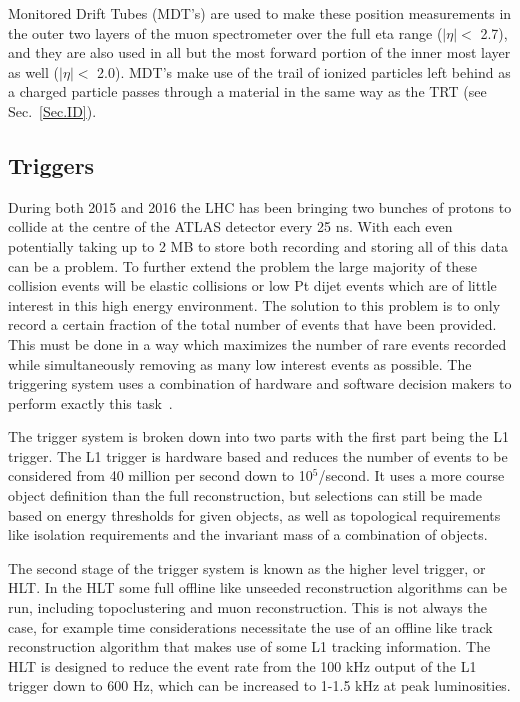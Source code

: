 Monitored Drift Tubes (MDT's) are used to make these position measurements in the outer two layers of the muon spectrometer over the full eta range ($\mid\eta\mid<$ 2.7), and they are also used in all but the most forward portion of the inner most layer as well ($\mid\eta\mid<$ 2.0).  
MDT's make use of the trail of ionized particles left behind as a charged particle passes through a material in the same way as the TRT (see Sec.~\ref{Sec.ID}).  
 
 

\subsection{Triggers}
\label{Trig}
During both 2015 and 2016 the LHC has been bringing two bunches of protons to collide at the centre of the ATLAS detector every 25 ns.  
With each even potentially taking up to 2 MB to store both recording and storing all of this data can be a problem.  
To further extend the problem the large majority of these collision events will be elastic collisions or low Pt dijet events which are of little interest in this high energy environment.  
The solution to this problem is to only record a certain fraction of the total number of events that have been provided.  
This must be done in a way which maximizes the number of rare events recorded while simultaneously removing as many low interest events as possible.  
The triggering system uses a combination of hardware and software decision makers to perform exactly this task~\cite{Run2Triggers}.  

The trigger system is broken down into two parts with the first part being the L1 trigger.  
The L1 trigger is hardware based and reduces the number of events to be considered from 40 million per second down to 10$^5$/second.  
It uses a more course object definition than the full reconstruction, but selections can still be made based on energy thresholds for given objects, as well as topological requirements like isolation requirements and the invariant mass of a combination of objects.  

The second stage of the trigger system is known as the higher level trigger, or HLT.  
In the HLT some full offline like unseeded reconstruction algorithms can be run, including topoclustering and muon reconstruction.  
This is not always the case, for example time considerations necessitate the use of an offline like track reconstruction algorithm that makes use of some L1 tracking information.  
The HLT is designed to reduce the event rate from the 100 kHz output of the L1 trigger down to 600 Hz, which can be increased to 1-1.5 kHz at peak luminosities.  



